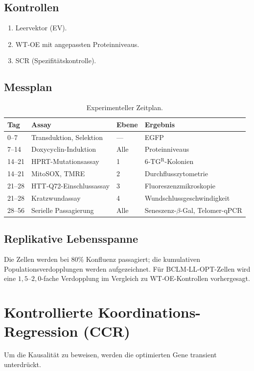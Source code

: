 \documentclass[12pt,a4paper]{article}
\begin{document}
	\subsection{Kontrollen}
	\begin{enumerate}
		\item Leervektor (EV).
		\item WT‑OE mit angepassten Proteinniveaus.
		\item SCR (Spezifitätskontrolle).
	\end{enumerate}
	
	\subsection{Messplan}
	\begin{table}[H]
		\centering
		\caption{Experimenteller Zeitplan.}
		\label{tab:schedule}
		\begin{tabular}{@{}llll@{}}
			\toprule
			\textbf{Tag} & \textbf{Assay} & \textbf{Ebene} & \textbf{Ergebnis} \\
			\midrule
			0–7   & Transduktion, Selektion & --- & EGFP \\
			7–14  & Doxycyclin-Induktion & Alle & Proteinniveaus \\
			14–21 & HPRT-Mutationsassay & 1 & 6‑TG\(^{\mathrm{R}}\)-Kolonien \\
			14–21 & MitoSOX, TMRE & 2 & Durchflusszytometrie \\
			21–28 & HTT‑Q72-Einschlussassay & 3 & Fluoreszenzmikroskopie \\
			21–28 & Kratzwundassay & 4 & Wundschlussgeschwindigkeit \\
			28–56 & Serielle Passagierung & Alle & Seneszenz-\(\beta\)-Gal, Telomer-qPCR \\
			\bottomrule
		\end{tabular}
	\end{table}
	
	\subsection{Replikative Lebensspanne}
	Die Zellen werden bei 80\% Konfluenz passagiert; die kumulativen Populationsverdopplungen werden aufgezeichnet. Für BCLM‑LL‑OPT-Zellen wird eine \(1,5\)–\(2,0\)-fache Verdopplung im Vergleich zu WT‑OE-Kontrollen vorhergesagt.
	
	\section{Kontrollierte Koordinations-Regression (CCR)}
	\label{sec:CCR}
	Um die Kausalität zu beweisen, werden die optimierten Gene transient unterdrückt.
	
\end{document}
